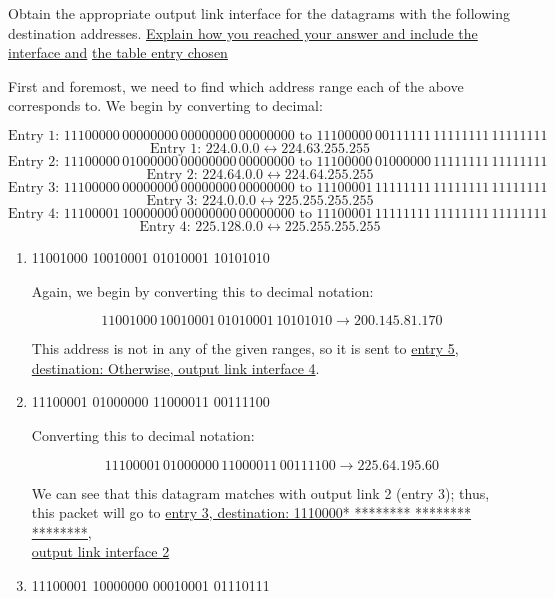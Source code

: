 \begin{enumerate}
  Obtain the appropriate output link interface for the datagrams with the following destination addresses. \underline{Explain how you reached your answer and include the interface and} \underline{the table entry chosen}

  First and foremost, we need to find which address range each of the above corresponds to. We begin by converting to decimal:

  $$\text{Entry 1: } 11100000\, 00000000\, 00000000\, 00000000\text{ to }11100000\, 00111111\, 11111111\, 11111111$$
  $$\text{Entry 1: } 224.0.0.0\longleftrightarrow 224.63.255.255$$
  $$\text{Entry 2: } 11100000\, 01000000\, 00000000\, 00000000\text{ to }11100000\, 01000000\, 11111111\, 11111111$$
  $$\text{Entry 2: } 224.64.0.0\longleftrightarrow224.64.255.255$$
  $$\text{Entry 3: } 11100000\, 00000000\, 00000000\, 00000000\text{ to }11100001\, 11111111\, 11111111\, 11111111$$
  $$\text{Entry 3: } 224.0.0.0\longleftrightarrow225.255.255.255$$
  $$\text{Entry 4: } 11100001\, 10000000\, 00000000\, 00000000\text{ to }11100001\, 11111111\, 11111111\, 11111111$$
  $$\text{Entry 4: } 225.128.0.0\longleftrightarrow225.255.255.255$$

    \begin{enumerate}

      \item 11001000 10010001 01010001 10101010 

        Again, we begin by converting this to decimal notation:

        $$11001000\, 10010001\, 01010001\, 10101010\longrightarrow 200.145.81.170$$

        This address is not in any of the given ranges, so it is sent to \underline{entry 5,}\\ \underline{destination: Otherwise, output link interface 4}.

      \item 11100001 01000000 11000011 00111100 

        Converting this to decimal notation:

        $$11100001\, 01000000\, 11000011\, 00111100\longrightarrow 225.64.195.60$$

        We can see that this datagram matches with output link 2 (entry 3); thus, this packet will go to \underline{entry 3, destination: 1110000* ******** ******** ********,}\\\underline{output link interface 2}

      \item 11100001 10000000 00010001 01110111


\end{enumerate}
\end{enumerate}
